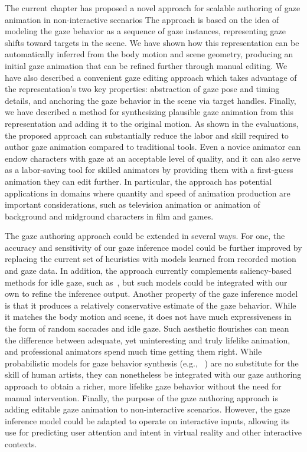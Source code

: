 The current chapter has proposed a novel approach for scalable authoring of gaze animation in non-interactive scenarios The approach is based on the idea of modeling the gaze behavior as a sequence of gaze instances, representing gaze shifts toward targets in the scene. We have shown how this representation can be automatically inferred from the body motion and scene geometry, producing an initial gaze animation that can be refined further through manual editing. We have also described a convenient gaze editing approach which takes advantage of the representation's two key properties: abstraction of gaze pose and timing details, and anchoring the gaze behavior in the scene via target handles. Finally, we have described a method for synthesizing plausible gaze animation from this representation and adding it to the original motion. As shown in the evaluations, the proposed approach can substantially reduce the labor and skill required to author gaze animation compared to traditional tools. Even a novice animator can endow characters with gaze at an acceptable level of quality, and it can also serve as a labor-saving tool for skilled animators by providing them with a first-guess animation they can edit further. In particular, the approach has potential applications in domains where quantity and speed of animation production are important considerations, such as television animation or animation of background and midground characters in film and games.

The gaze authoring approach could be extended in several ways.
For one, the accuracy and sensitivity of our gaze inference model could be further improved by replacing the current set of heuristics with models learned from recorded motion and gaze data.
In addition, the approach currently complements saliency-based methods for idle gaze, such as~\citep{peters2003bottomup}, but such models could be integrated with our own to refine the inference output.
Another property of the gaze inference model is that it produces a relatively conservative estimate of the gaze behavior. While it matches the body motion and scene, it does not have much expressiveness in the form of random saccades and idle gaze. Such aesthetic flourishes can mean the difference between adequate, yet uninteresting and truly lifelike animation, and professional animators spend much time getting them right. While probabilistic models for gaze behavior synthesis (e.g., ~\citep{lee2002eyes}) are no substitute for the skill of human artists, they can nonetheless be integrated with our gaze authoring approach to obtain a richer, more lifelike gaze behavior without the need for manual intervention.
Finally, the purpose of the gaze authoring approach is adding editable gaze animation to non-interactive scenarios. However, the gaze inference model could be adapted to operate on interactive inputs, allowing its use for predicting user attention and intent in virtual reality and other interactive contexts.


